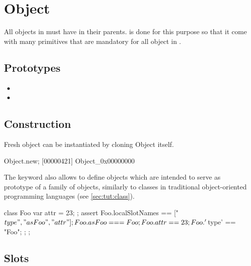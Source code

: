 \section{Object}

All objects in \us must have  in their
parents.  is done for this purpose so that it come
with many primitives that are mandatory for all object in \us.

\subsection{Prototypes}

\begin{itemize}
\item {}
\item {}
\end{itemize}

\subsection{Construction}

Fresh object can be instantiated by cloning Object itself.

\begin{urbiscript}[firstnumber=1]
Object.new;
[00000421] Object_0x00000000
\end{urbiscript}

The keyword  also allows to define objects which are
intended to serve as prototype of a family of objects, similarly to
classes in traditional object-oriented programming languages (see
\autoref{sec:tut:class}).

\begin{urbiscript}
{
  class Foo
  {
    var attr = 23;
  };
  assert
  {
    Foo.localSlotNames == ["$type", "asFoo", "attr"];
    Foo.asFoo === Foo;
    Foo.attr == 23;
    Foo.'$type' == "Foo";
  };
};
\end{urbiscript}


\subsection{Slots}

